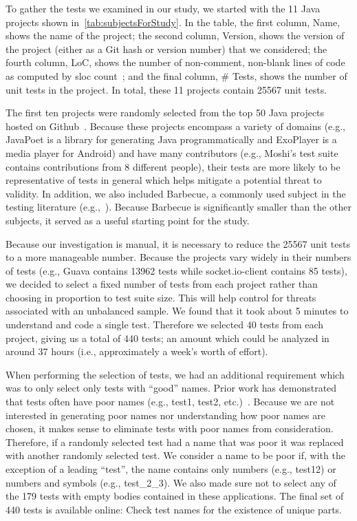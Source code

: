 \documentclass[proposal.tex]{subfiles}
\begin{document}
To gather the tests we examined in our study, we started with the 11 Java projects shown in~\cref{tab:subjectsForStudy}.
%
In the table, the first column, Name, shows the name of the project; the second column, Version, shows the version of the project (either as a Git hash or version number) that we considered; the fourth column, LoC, shows the number of non-comment, non-blank lines of code as computed by sloc count~\cite{nguyen2007sloc}; and the final column, \# Tests, shows the number of unit tests in the project. In total, these 11 projects contain \num{25567} unit tests.

The first ten projects were randomly selected from the top \num{50} Java projects hosted on Github~\cite{top50projects}.
%
Because these projects encompass a variety of domains (e.g., JavaPoet is a library for generating Java programmatically and ExoPlayer is a media player for Android) and have many contributors (e.g., Moshi’s test suite contains contributions from \num{8} different people), their tests are more likely to be representative of tests in general which helps mitigate a potential threat to validity.
%
In addition, we also included Barbecue, a commonly used subject in the testing literature (e.g.,~\cite{zhang2015automatically, zhang2016towards,wu2020pattern}).
%
Because Barbecue is significantly smaller than the other subjects, it served as a useful starting point for the study.

Because our investigation is manual, it is necessary to reduce the \num{25567} unit tests to a more manageable number.
%
Because the projects vary widely in their numbers of tests (e.g., Guava contains \num{13962} tests while socket.io-client contains \num{85} tests), we decided to select a fixed number of tests from each project rather than choosing in proportion to test suite size.
%
This will help control for threats associated with an unbalanced sample.
%
We found that it took about \num{5} minutes to understand and code a single test.
%
Therefore we selected 40 tests from each project, giving us a total of \num{440} tests; an amount which could be analyzed in around \num{37} hours (i.e., approximately a week’s worth of effort).

When performing the selection of tests, we had an additional requirement which was to only select only tests with \enquote{good} names.
%
Prior work has demonstrated that tests often have poor names (e.g., test1, test2, etc.)~\cite{zhang2016towards}.
%
Because we are not interested in generating poor names nor understanding how poor names are chosen, it makes sense to eliminate tests with poor names from consideration.
%
Therefore, if a randomly selected test had a name that was poor it was replaced with another randomly selected test.
%
We consider a name to be poor if, with the exception of a leading \enquote{test}, the name contains only numbers (e.g., test12) or numbers and symbols (e.g., test\_2\_3).
%
We also made sure not to select any of the \num{179} tests with empty bodies contained in these applications.
%
The final set of \num{440} tests is available online: Check test names for the existence of unique parts.
\end{document}
